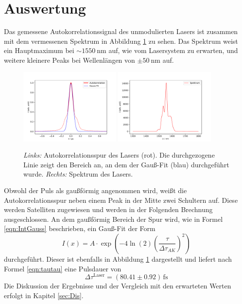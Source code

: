 \newpage
\section{Auswertung}
    Das gemessene Autokorrelationssignal des unmodulierten Lasers ist zusammen mit dem vermessenen Spektrum in Abbildung \ref{fig:normal} zu sehen. Das Spektrum weist ein Hauptmaximum bei $\sim \SI{1550}{\nano\metre}$ auf, wie vom Lasersystem zu erwarten, und weitere kleinere Peaks bei Wellenlängen von $\pm \SI{50}{\nano\metre}$ auf.
    \begin{figure}
        \centering
        \includegraphics[width = 0.45\textwidth]{pictures/Puls_normal.pdf}
        \includegraphics[width = 0.45\textwidth]{pictures/Spektrum_normal.pdf}
        \caption{\textit{Links:} Autokorrelationsspur des Lasers (rot). Die durchgezogene Linie zeigt den Bereich an, an dem der Gauß-Fit (blau) durchgeführt wurde. \textit{Rechts:} Spektrum des Lasers.}
        \label{fig:normal}    
    \end{figure}
    Obwohl der Puls als gaußförmig angenommen wird, weißt die Autokorrelationsspur neben einem Peak in der Mitte zwei Schultern auf. Diese werden Satelliten zugewiesen und werden in der Folgenden Brechnung ausgeschlossen. An dem gaußförmig Bereich der Spur wird, wie in Formel \ref{eqn:IntGauss} beschrieben, ein Gauß-Fit der Form
    \begin{equation}
        I(x) = A \cdot \exp\left(-4\ln(2)\left(\frac{\tau}{\Delta \tau_{AK}}\right)^2\right)
    \end{equation}
    durchgeführt. Dieser ist ebenfalls in Abbildung \ref{fig:normal} dargestellt und liefert nach Formel \ref{eqn:tautau} eine Pulsdauer von
    \begin{equation}
        \Delta \tau^{\text{Laser}} = (80.41\pm 0.92)\,\text{fs}
    \end{equation}
    Die Diskussion der Ergebnisse und der Vergleich mit den erwarteten Werten erfolgt in Kapitel \ref{sec:Dis}.
